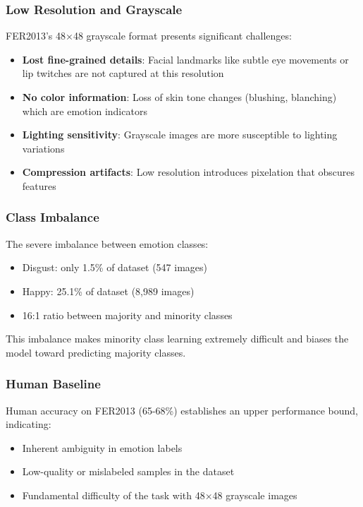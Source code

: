 \documentclass[12pt,a4paper]{article}
\begin{document}
\subsubsection{Low Resolution and Grayscale}
FER2013's 48×48 grayscale format presents significant challenges:
\begin{itemize}[leftmargin=*]
    \item \textbf{Lost fine-grained details}: Facial landmarks like subtle eye movements or lip twitches are not captured at this resolution
    \item \textbf{No color information}: Loss of skin tone changes (blushing, blanching) which are emotion indicators
    \item \textbf{Lighting sensitivity}: Grayscale images are more susceptible to lighting variations
    \item \textbf{Compression artifacts}: Low resolution introduces pixelation that obscures features
\end{itemize}


\subsubsection{Class Imbalance}
The severe imbalance between emotion classes:
\begin{itemize}[leftmargin=*]
    \item Disgust: only 1.5\% of dataset (547 images)
    \item Happy: 25.1\% of dataset (8,989 images)
    \item 16:1 ratio between majority and minority classes
\end{itemize}
This imbalance makes minority class learning extremely difficult and biases the model toward predicting majority classes.

\subsubsection{Human Baseline}
Human accuracy on FER2013 (65-68\%) establishes an upper performance bound, indicating:
\begin{itemize}[leftmargin=*]
    \item Inherent ambiguity in emotion labels
    \item Low-quality or mislabeled samples in the dataset
    \item Fundamental difficulty of the task with 48×48 grayscale images
\end{itemize}
\end{document}
